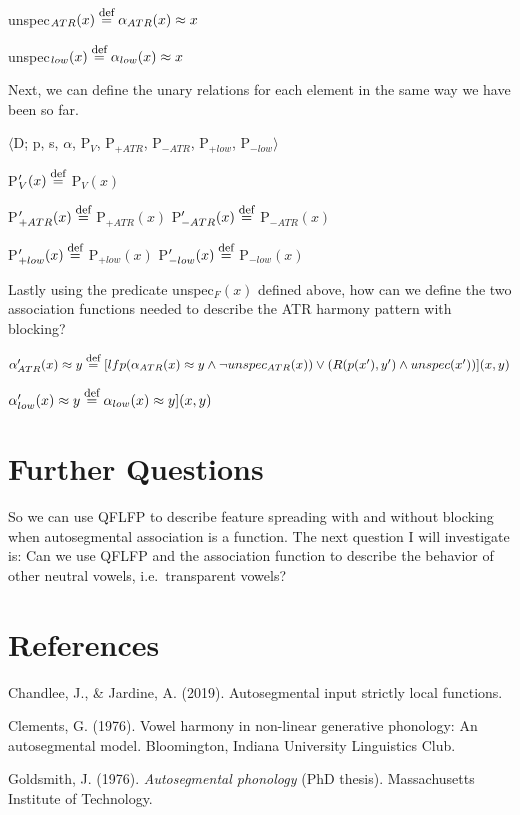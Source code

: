 \documentclass[,doc,floatsintext]{apa6}
\def\defeq{\mathrel{\buildrel \mbox{\footnotesize def} \over =}}
\theoremstyle{definition}
\theoremstyle{definition}
\theoremstyle{definition}
\theoremstyle{remark}
\begin{document}
unspec\(_{ATR}(x) \defeq \alpha_{ATR}(x)\approx x\)

unspec\(_{low}(x) \defeq \alpha_{low}(x)\approx x\)

\newpage

\noindent Next, we can define the unary relations for each element in
the same way we have been so far.

\begin{exe}
\ex\label{function.block} $\langle$D; p, s, $\alpha$, P$_V$, P$_{+ATR}$, P$_{-ATR}$, P$_{+low}$, P$_{-low}\rangle$ 
\end{exe}

P\('_{V}(x) \defeq\) P\(_{V}(x)\)

P\('_{+ATR}(x) \defeq\) P\(_{+ATR}(x)\) \hspace{2in}
P\('_{-ATR}(x) \defeq\) P\(_{-ATR}(x)\)

P\('_{+low}(x) \defeq\) P\(_{+low}(x)\) \hspace{2in}
P\('_{-low}(x) \defeq\) P\(_{-low}(x)\)

\noindent Lastly using the predicate unspec\(_F(x)\) defined above, how
can we define the two association functions needed to describe the ATR
harmony pattern with blocking?

\noindent \(\alpha_{ATR}'(x)\approx y \defeq [lfp(\alpha_{ATR}(x)\approx y\wedge \neg unspec_{ATR}(x)) \vee (R(p(x'), y')\wedge unspec(x'))](x,y)\)

\noindent \(\alpha_{low}'(x)\approx y \defeq \alpha_{low}(x)\approx y](x,y)\)

\section{Further Questions}\label{further-questions}

So we can use QFLFP to describe feature spreading with and without
blocking when autosegmental association is a function. The next question
I will investigate is: Can we use QFLFP and the association function to
describe the behavior of other neutral vowels, i.e.~transparent vowels?
\vspace{2.5in}

\section{References}\label{references}

\begingroup
\setlength{\parindent}{-0.5in} \setlength{\leftskip}{0.5in}

\hypertarget{refs}{}
\hypertarget{ref-chandleejardineaisl}{}
Chandlee, J., \& Jardine, A. (2019). Autosegmental input strictly local
functions.

\hypertarget{ref-Clements1976}{}
Clements, G. (1976). Vowel harmony in non-linear generative phonology:
An autosegmental model. Bloomington, Indiana University Linguistics
Club.

\hypertarget{ref-Goldsmith1976}{}
Goldsmith, J. (1976). \emph{Autosegmental phonology} (PhD thesis).
Massachusetts Institute of Technology.

\endgroup
\end{document}
